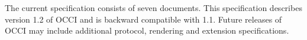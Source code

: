 The current specification consists of seven documents. This 
specification describes version 1.2 of OCCI and is backward compatible with 1.1. 
Future releases of OCCI
may include additional protocol, rendering and extension specifications. 
%
